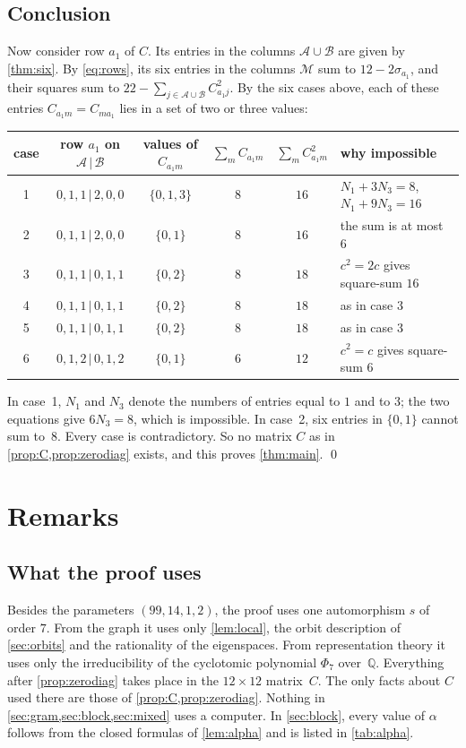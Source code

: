 \documentclass[11pt,a4paper]{amsart}
\theoremstyle{definition}
\theoremstyle{remark}
\newcommand{\Q}{\mathbb{Q}}
\newcommand{\cA}{\mathcal{A}}
\newcommand{\cB}{\mathcal{B}}
\newcommand{\cM}{\mathcal{M}}
\begin{document}
\subsection*{Conclusion}
Now consider row $a_1$ of $C$. Its entries in the columns $\cA\cup\cB$ are given by \cref{thm:six}. By
\eqref{eq:rows}, its six entries in the columns $\cM$ sum to $12-2\sigma_{a_1}$, and their squares sum to
$22-\sum_{j\in\cA\cup\cB}C_{a_1j}^2$. By the six cases above, each of these entries $C_{a_1m}=C_{ma_1}$ lies in a
set of two or three values:
\begin{center}\small
\begin{tabular}{@{}cccccl@{}}
\toprule
case & row $a_1$ on $\cA\,|\,\cB$ & values of $C_{a_1m}$ & $\sum_m C_{a_1m}$ & $\sum_mC_{a_1m}^2$ & why impossible\\
\midrule
1 & $0,1,1\,|\,2,0,0$ & $\{0,1,3\}$ & $8$ & $16$ & $N_1+3N_3=8$, $N_1+9N_3=16$\\
2 & $0,1,1\,|\,2,0,0$ & $\{0,1\}$ & $8$ & $16$ & the sum is at most $6$\\
3 & $0,1,1\,|\,0,1,1$ & $\{0,2\}$ & $8$ & $18$ & $c^2=2c$ gives square-sum $16$\\
4 & $0,1,1\,|\,0,1,1$ & $\{0,2\}$ & $8$ & $18$ & as in case 3\\
5 & $0,1,1\,|\,0,1,1$ & $\{0,2\}$ & $8$ & $18$ & as in case 3\\
6 & $0,1,2\,|\,0,1,2$ & $\{0,1\}$ & $6$ & $12$ & $c^2=c$ gives square-sum $6$\\
\bottomrule
\end{tabular}
\end{center}
In case~1, $N_1$ and $N_3$ denote the numbers of entries equal to $1$ and to $3$; the two equations give
$6N_3=8$, which is impossible. In case~2, six entries in $\{0,1\}$ cannot sum to~$8$. Every case is
contradictory. So no matrix $C$ as in
\cref{prop:C,prop:zerodiag} exists, and this proves \cref{thm:main}. \qed

\section{Remarks}\label{sec:checks}

\subsection*{What the proof uses}
Besides the parameters $(99,14,1,2)$, the proof uses one automorphism $s$ of order $7$. From the graph it
uses only \cref{lem:local}, the orbit description of \cref{sec:orbits} and the rationality of the
eigenspaces. From representation theory it uses only the irreducibility of the cyclotomic polynomial
$\Phi_7$ over~$\Q$. Everything after \cref{prop:zerodiag} takes place in the $12\times12$ matrix~$C$.
The only facts about $C$ used there are those of \cref{prop:C,prop:zerodiag}. Nothing in
\cref{sec:gram,sec:block,sec:mixed} uses a computer. In \cref{sec:block}, every value of $\alpha$
follows from the closed formulas of \cref{lem:alpha} and is listed in \cref{tab:alpha}.
\end{document}
